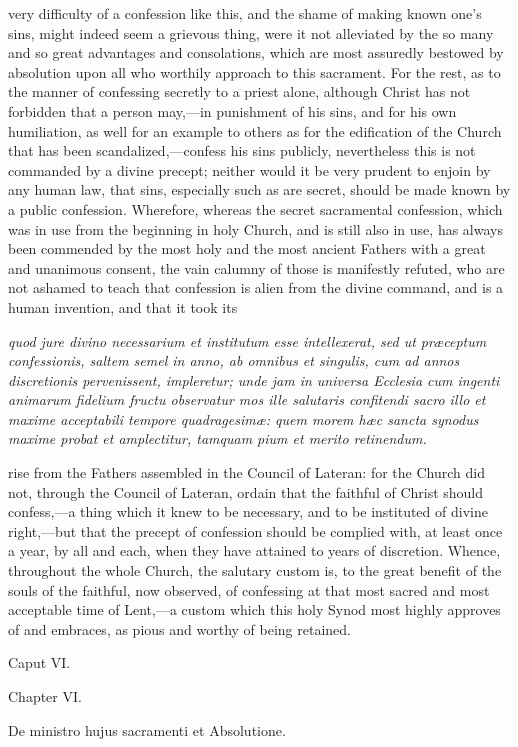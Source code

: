 very difficulty of a confession like this, and the shame of making known one's sins, might indeed seem a grievous thing, were it not alleviated by the so many and so great advantages and consolations, which are most assuredly bestowed by absolution upon all who worthily approach to this sacrament. For the rest, as to the manner of confessing secretly to a priest alone, although Christ has not forbidden that a person may,—in punishment of his sins, and for his own humiliation, as well for an example to others as for the edification of the Church that has been scandalized,—confess his sins publicly, nevertheless this is not commanded by a divine precept; neither would it be very prudent to enjoin by any human law, that sins, especially such as are secret, should be made known by a public confession. Wherefore, whereas the secret sacramental confession, which was in use from the beginning in holy Church, and is still also in use, has always been commended by the most holy and the most ancient Fathers with a great and unanimous consent, the vain calumny of those is manifestly refuted, who are not ashamed to teach that confession is alien from the divine command, and is a human invention, and that it took its

\emph{quod jure divino necessarium et institutum esse intellexerat, sed ut præceptum confessionis, saltem semel in anno, ab omnibus et singulis, cum ad annos discretionis pervenissent, impleretur; unde jam in universa Ecclesia cum ingenti animarum fidelium fructu observatur mos ille salutaris confitendi sacro illo et maxime acceptabili tempore quadragesimæ: quem morem hæc sancta synodus maxime probat et amplectitur, tamquam pium et merito retinendum.}

rise from the Fathers assembled in the Council of Lateran: for the Church did not, through the Council of Lateran, ordain that the faithful of Christ should confess,—a thing which it knew to be necessary, and to be instituted of divine right,—but that the precept of confession should be complied with, at least once a year, by all and each, when they have attained to years of discretion. Whence, throughout the whole Church, the salutary custom is, to the great benefit of the souls of the faithful, now observed, of confessing at that most sacred and most acceptable time of Lent,—a custom which this holy Synod most highly approves of and embraces, as pious and worthy of being retained.

Caput VI.

Chapter VI.

De ministro hujus sacramenti et Absolutione.

